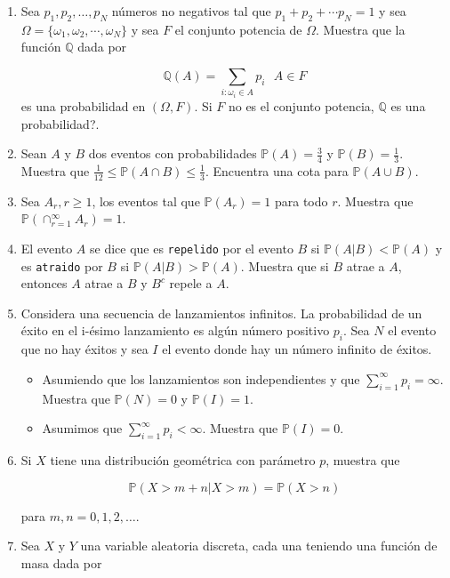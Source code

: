 \documentclass[a4paper,11pt]{report}
\begin{document}
\begin{enumerate}
\item Sea $p_1, p_2, \dots, p_N$ n\'umeros no negativos tal que $p_1 + p_2 + \cdots p_N = 1$ y sea $\Omega = \{\omega_1, \omega_2, \cdots, \omega_N \}$ y sea $F$ el conjunto potencia de $\Omega$. Muestra que la funci\'on $\mathbb{Q}$ dada por

$$
\mathbb{Q}(A) = \sum_{i:\omega_i \in A}p_i \ \ \ A \in F
$$
es una probabilidad en $(\Omega, F)$. Si $F$ no es el conjunto potencia, $\mathbb{Q}$ es una probabilidad?.
\item Sean $A$ y $B$ dos eventos con probabilidades $\mathbb{P}(A) = \frac{3}{4}$ y $\mathbb{P}(B) = \frac{1}{3}$. Muestra que $\frac{1}{12} \leq \mathbb{P}(A \cap B) \leq \frac{1}{3}$. Encuentra una cota para $\mathbb{P}(A \cup B)$.
\item Sea $A_r, r\geq 1$, los eventos tal que $\mathbb{P}(A_r) = 1$ para todo $r$. Muestra que $\mathbb{P}(\displaystyle\cap_{r =1}^{\infty}A_r) = 1$.
\item El evento $A$ se dice que es \texttt{repelido} por el evento $B$ si $\mathbb{P}(A|B) < \mathbb{P}(A)$ y es \texttt{atraido} por $B$ si $\mathbb{P}(A|B) > \mathbb{P}(A)$. Muestra que si $B$ atrae a $A$, entonces $A$ atrae a $B$ y $B^c$ repele a $A$.
\item Considera una secuencia de lanzamientos infinitos. La probabilidad de un \'exito en el i-\'esimo \mbox{lanzamiento} es alg\'un n\'umero positivo $p_i$. Sea $N$ el evento que no hay \'exitos y sea $I$ el evento donde hay un n\'umero infinito de \'exitos.

\begin{itemize}
	\item Asumiendo que los lanzamientos son independientes y que $\displaystyle\sum_{i=1}^{\infty}p_i = \infty$. Muestra que $\mathbb{P}(N) =0$ y $\mathbb{P}(I) = 1$.
	\item Asumimos que $\displaystyle\sum_{i=1}^{\infty}p_i < \infty$. Muestra que $\mathbb{P}(I) = 0$.
\end{itemize}
\item Si $X$ tiene una distribuci\'on geom\'etrica con par\'ametro $p$, muestra que

\[
\mathbb{P}(X > m + n| X > m) = \mathbb{P}(X > n)
\]

para $m, n = 0,1,2, \dots$.

\item Sea $X$ y $Y$ una variable aleatoria discreta, cada una teniendo una funci\'on de masa dada por


\end{enumerate}
\end{document}
